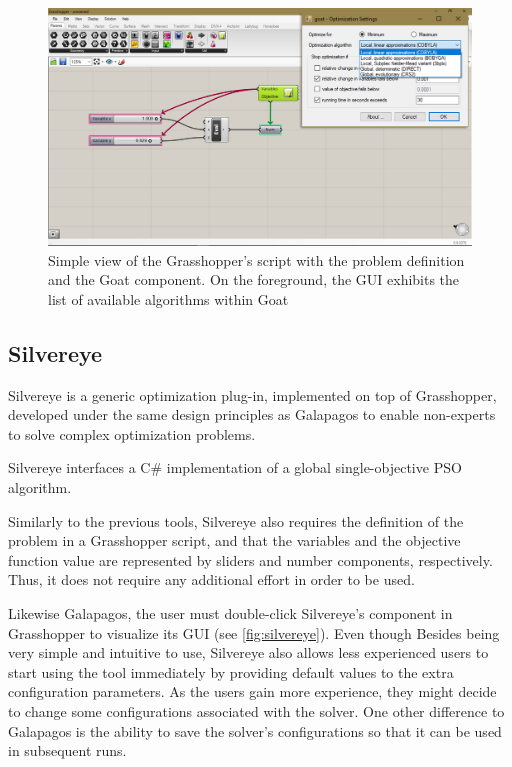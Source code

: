 	\begin{figure}
		\centering
		\includegraphics[width=1\textwidth]{Images/Background/Goat/general-view.png}
		\caption[Goat GUI]{Simple view of the Grasshopper's script with the problem definition and the Goat component. On the foreground, the \ac{GUI} exhibits the list of available algorithms within Goat}
		\label{fig:goat}
	\end{figure}
	
	
	\subsection{Silvereye}
	Silvereye \cite{Cichocka2017SILVEREYE} is a generic optimization plug-in, implemented on top of Grasshopper, developed under the same design principles as Galapagos to enable non-experts to solve complex optimization problems. 
	
	Silvereye interfaces a C\# implementation of a global single-objective \ac{PSO} algorithm.
	
	Similarly to the previous tools, Silvereye also requires the definition of the problem in a Grasshopper script, and that the variables and the objective function value are represented by sliders and number components, respectively. Thus, it does not require any additional effort in order to be used.
	
	Likewise Galapagos, the user must double-click Silvereye's component in Grasshopper to visualize its \ac{GUI} (see \cref{fig:silvereye}). Even though Besides being very simple and intuitive to use, Silvereye also allows less experienced users to start using the tool immediately by providing default values to the extra configuration parameters. As the users gain more experience, they might decide to change some configurations associated with the solver. One other difference to Galapagos is the ability to save the solver's configurations so that it can be used in subsequent runs.
	
